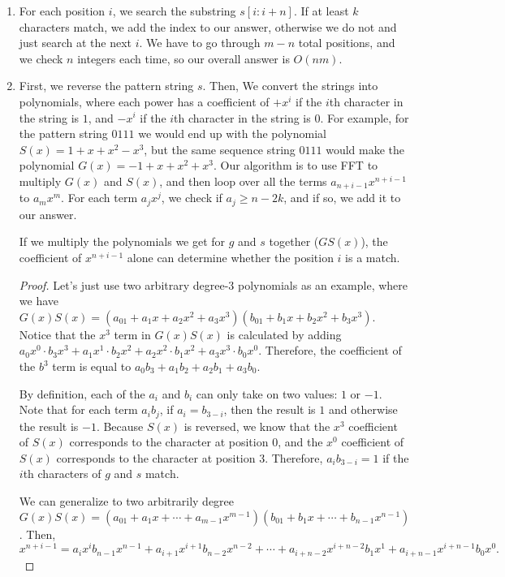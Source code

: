 \documentclass{article}
\begin{document}
\begin{enumerate}[label = \alph*)]
	\item For each position $i$, we search the substring $s[i:i+n]$. If at least $k$ characters match, we add the index to our answer, otherwise we do not and just search at the next $i$. We have to go through $m - n$ total positions, and we check $n$ integers each time, so our overall answer is $O(nm)$.
	\item First, we reverse the pattern string $s$. Then, We convert the strings into polynomials, where each power has a coefficient of $+x^i$ if the $i$th character in the string is $1$, and $-x^i$ if the $i$th character in the string is $0$. For example, for the pattern string $0111$ we would end up with the polynomial $S(x) = 1 + x + x^2 - x^3$, but the same sequence string $0111$ would make the polynomial $G(x) = -1 + x + x^2 + x^3$. Our algorithm is to use FFT to multiply $G(x)$ and $S(x)$, and then loop over all the terms $a_{n+i-1}x^{n+i-1}$ to $a_mx^m$. For each term $a_jx^j$, we check if $a_j \geq n-2k$, and if so, we add it to our answer.
	
	\begin{lemma}
		If we multiply the polynomials we get for $g$ and $s$ together ($GS(x)$), the coefficient of $x^{n+i-1}$ alone can determine whether the position $i$ is a match.
	\end{lemma}
	\begin{proof}
		Let's just use two arbitrary degree-3 polynomials as an example, where we have $G(x)S(x) = (a_01 + a_1x + a_2x^2 + a_3x^3)(b_01 + b_1x + b_2x^2 + b_3x^3)$. Notice that the $x^3$ term in $G(x)S(x)$ is calculated by adding $a_0x^0 \cdot b_3x^3 + a_1x^1 \cdot b_2x^2 + a_2x^2 \cdot b_1x^2 + a_3x^3 \cdot b_0x^0$. Therefore, the coefficient of the $b^3$ term is equal to $a_0b_3 + a_1b_2 + a_2b_1 + a_3b_0$.

		By definition, each of the $a_i$ and $b_i$ can only take on two values: $1$ or $-1$. Note that for each term $a_ib_j$, if $a_i = b_{3-i}$, then the result is $1$ and otherwise the result is $-1$. Because $S(x)$ is reversed, we know that the $x^3$ coefficient of $S(x)$ corresponds to the character at position $0$, and the $x^0$ coefficient of $S(x)$ corresponds to the character at position $3$. Therefore, $a_ib_{3-i} = 1$ if the $i$th characters of $g$ and $s$ match.

		We can generalize to two arbitrarily degree $G(x)S(x) = (a_01 + a_1x + \cdots + a_{m-1}x^{m-1})(b_01 + b_1x + \cdots + b_{n-1}x^{n-1})$. Then, \[x^{n + i - 1} = a_ix^i b_{n-1}x^{n-1} + a_{i+1}x^{i+1}b_{n-2}x^{n-2} + \cdots + a_{i+n-2}x^{i+n-2} b_1x^1 + a_{i+n-1}x^{i+n-1}b_0x^0.\]


\end{proof}
\end{enumerate}
\end{document}
